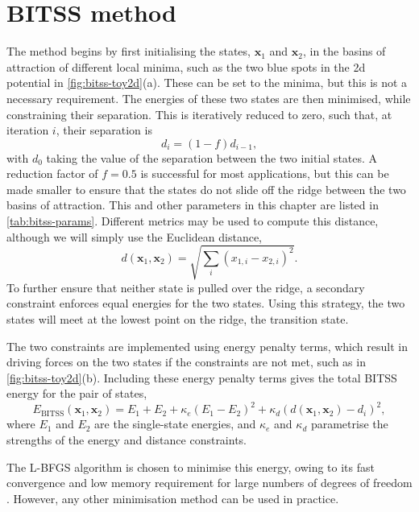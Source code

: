 \section{BITSS method}
The method begins by first initialising the states, $\bm{x}_1$ and $\bm{x}_2$, in the basins of attraction of different local minima, such as the two blue spots in the 2d potential in \cref{fig:bitss-toy2d}(a).
These can be set to the minima, but this is not a necessary requirement.
The energies of these two states are then minimised, while constraining their separation.
This is iteratively reduced to zero, such that, at iteration $i$, their separation is
\begin{equation}\label{eq:bitss-diteration}
  d_i = (1 - f) d_{i-1},
\end{equation}
with $d_0$ taking the value of the separation between the two initial states.
A reduction factor of $f = 0.5$ is successful for most applications, but this can be made smaller to ensure that the states do not slide off the ridge between the two basins of attraction.
This and other parameters in this chapter are listed in \cref{tab:bitss-params}.
Different metrics may be used to compute this distance, although we will simply use the Euclidean distance,
\begin{equation}
  d(\bm{x}_1, \bm{x}_2) = \sqrt{\sum_i (x_{1,i} - x_{2,i})^2}.
\end{equation}
To further ensure that neither state is pulled over the ridge, a secondary constraint enforces equal energies for the two states.
Using this strategy, the two states will meet at the lowest point on the ridge, the transition state.

The two constraints are implemented using energy penalty terms, which result in driving forces on the two states if the constraints are not met, such as in \cref{fig:bitss-toy2d}(b).
Including these energy penalty terms gives the total BITSS energy for the pair of states,
\begin{equation}\label{eq:bitss-e}
  E_\mathrm{BITSS}(\bm{x}_1, \bm{x}_2) = E_1 + E_2
    + \kappa_e \left( E_1 - E_2 \right) ^2
    + \kappa_d \left( d(\bm{x}_1, \bm{x}_2) - d_i \right) ^2,
\end{equation}
where $E_1$ and $E_2$ are the single-state energies, and $\kappa_e$ and $\kappa_d$ parametrise the strengths of the energy and distance constraints.

The L-BFGS algorithm is chosen to minimise this energy, owing to its fast convergence and low memory requirement for large numbers of degrees of freedom \cite{Liu1989}.
However, any other minimisation method can be used in practice.


